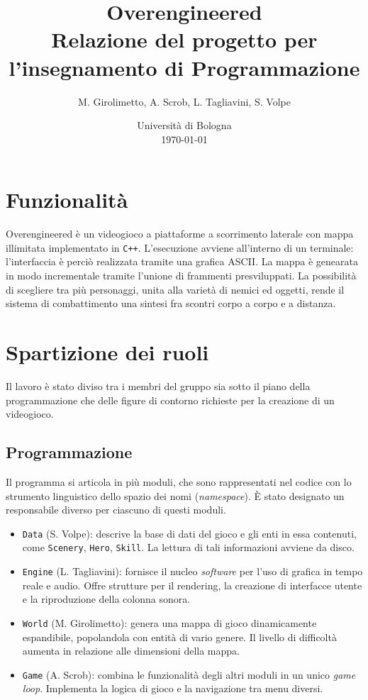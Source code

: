 \documentclass[a4paper]{article}
\title{Overengineered \\
\large Relazione del progetto per l'insegnamento di Programmazione}
\author{
  M. Girolimetto,
  A. Scrob,
  L. Tagliavini,
  S. Volpe
}
\date{
	Universit\`a di Bologna \\
  \today
}
\begin{document}
\maketitle

\section{Funzionalit\`a}

Overengineered \`e un videogioco a piattaforme a scorrimento laterale con mappa
illimitata implementato in \verb!C++!. L'esecuzione avviene all'interno di un terminale:
l'interfaccia \`e perci\`o realizzata tramite una grafica ASCII. La mappa \`e
genearata in modo incrementale tramite l'unione di frammenti presviluppati. La
possibilit\`a di scegliere tra pi\`u personaggi, unita alla variet\`a di nemici
ed oggetti, rende il sistema di combattimento una sintesi fra scontri corpo a
corpo e a distanza.

\section{Spartizione dei ruoli}

Il lavoro \`e stato diviso tra i membri del gruppo sia sotto il piano della
programmazione che delle figure di contorno richieste per la creazione di un videogioco.

\subsection{Programmazione}

Il programma si articola in pi\`u moduli, che sono rappresentati nel codice con
lo strumento linguistico dello spazio dei nomi (\emph{namespace}). \`E stato
designato un responsabile diverso per ciascuno di questi moduli.
\begin{itemize}
  \item \verb!Data! (S. Volpe): descrive la base di dati del gioco e gli enti in
    essa contenuti, come \verb!Scenery!, \verb!Hero!, \verb!Skill!. La lettura
    di tali informazioni avviene da disco.
  \item \verb!Engine! (L. Tagliavini): fornisce il nucleo \emph{software} per
    l'uso di grafica in tempo reale e audio. Offre strutture per il rendering,
    la creazione di interfacce utente e la riproduzione della colonna sonora.
  \item \verb!World! (M. Girolimetto): genera una mappa di gioco dinamicamente
    espandibile, popolandola con entit\`a di vario genere. Il livello di
    difficolt\`a aumenta in relazione alle dimensioni della mappa.
  \item \verb!Game! (A. Scrob): combina le funzionalit\`a degli altri moduli in
    un unico \emph{game loop}. Implementa la logica di gioco e la navigazione
    tra menu diversi.
\end{itemize}
\end{document}
